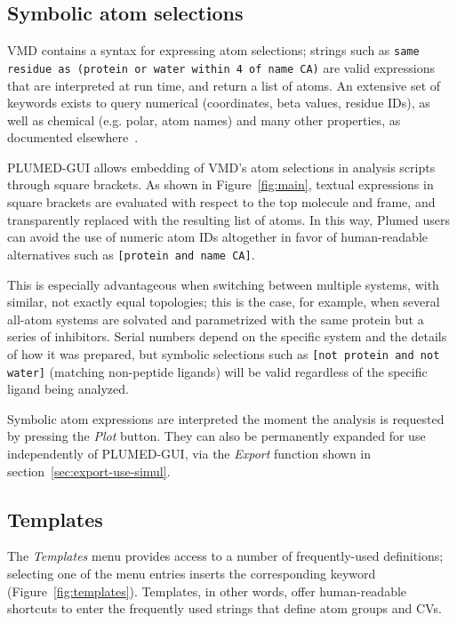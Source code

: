 \documentclass[preprint,12pt]{elsarticle}
\begin{document}
\subsection{Symbolic atom selections}\label{sec:symb-atom-select}

VMD contains a syntax for expressing atom selections; strings such as
\texttt{same residue as (protein or water within 4 of name CA)} are valid
expressions that are interpreted at run time, and return a list of
atoms.  An extensive set of keywords exists to query numerical
(coordinates, beta values, residue IDs), as well as chemical
(e.g. polar, atom names) and many other properties, as documented
elsewhere~\cite{Humphrey_Dalke_Schulten_1996}.

PLUMED-GUI allows  embedding of VMD's atom selections in analysis scripts
through  square brackets. As shown in Figure~\ref{fig:main},
textual expressions in square brackets are evaluated with respect to
the top molecule and frame, and transparently replaced with the
resulting list of atoms. In this way, Plumed users can 
avoid the use of numeric atom IDs altogether in favor of human-readable
alternatives such as \texttt{[protein and name CA]}.

This is especially advantageous when switching between multiple
systems, with similar, not exactly equal topologies; this is the case,
for example, when several all-atom systems are solvated and
parametrized with the same protein but a series of inhibitors.  Serial
numbers  depend on the specific system and the details of how it was prepared, but
symbolic selections such as \texttt{[not protein and not water]}
(matching non-peptide ligands) will be valid
regardless of the specific ligand being analyzed.

Symbolic atom expressions are interpreted the moment the analysis is
requested by pressing the \emph{Plot} button. They can also be
permanently expanded for use independently of PLUMED-GUI, via the
\emph{Export} function shown in section~\ref{sec:export-use-simul}.



\subsection{Templates}

The \emph{Templates} menu provides access to a number of frequently-used
definitions; selecting one of the menu entries inserts the
corresponding keyword (Figure~\ref{fig:templates}). Templates, in
other words, offer human-readable shortcuts to enter the frequently used
strings that define atom groups and CVs.
\end{document}
